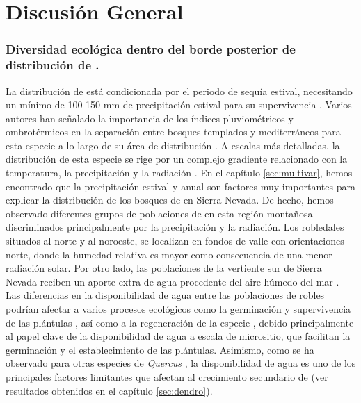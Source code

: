 %
\chapter{\textcolor{ctcolormain}{Discusión General}}\label{sec:discussions}
\newpage

\subsection*{Diversidad ecológica dentro del borde posterior de distribución de \Qp. }\label{sec:discussions:diversidad}

La distribución de \Qp está condicionada por el periodo de sequía estival, necesitando un mínimo de 100-150 mm de precipitación estival para su supervivencia \autocite{BlancoCastroetal2005BosquesIbericos,GarciaJimenez20099230Robledales}. Varios autores han señalado la importancia de los índices pluviométricos y ombrotérmicos en la separación entre bosques templados y mediterráneos para esta especie a lo largo de su área de distribución \autocite{delRioetal2007BioclimaticAnalysis}. A escalas más detalladas, la distribución de esta especie se rige por un complejo gradiente relacionado con la temperatura, la precipitación y la radiación \autocites{Gavilanetal2007ModellingCurrent,Urbietaetal2011MediterraneanPine}. En el capítulo \ref{sec:multivar}, hemos encontrado que la precipitación estival y anual son factores muy importantes para explicar la distribución de los bosques de \Qp en Sierra Nevada. De hecho, hemos observado diferentes grupos de poblaciones de \Qp en esta región montañosa discriminados principalmente por la precipitación y la radiación. Los robledales situados al norte y al noroeste, se localizan en fondos de valle con orientaciones norte, donde la humedad relativa es mayor como consecuencia de una menor radiación solar. Por otro lado, las poblaciones de la vertiente sur de Sierra Nevada reciben un aporte extra de agua procedente del aire húmedo del mar \autocite{MartinezParrasMoleroMesa1982EcologiaFitosociologia}. Las diferencias en la disponibilidad de agua entre las poblaciones de robles podrían afectar a varios procesos ecológicos como la germinación y supervivencia de las plántulas \autocites{Gomez2003ImpactVertebrate, GomezAparicioetal2008OakSeedling,Mendozaetal2009SeedingExperiment}, así como a la regeneración de la especie \autocites{Gomezetal2001ProblemasRegeneracion}, debido principalmente al papel clave de la disponibilidad de agua a escala de micrositio, que facilitan la germinación y el establecimiento de las plántulas. Asimismo, como se ha observado para otras especies de \emph{Quercus} \autocites[\emph{e.g.}][]{Tessieretal1994DeciduousQuercus,DiFilippoetal2010ClimateChange,GeaIzquierdoetal2011TreeringsReflect,GarciaGonzalezSoutoHerrero2017EarlywoodVessel}, la disponibilidad de agua es uno de los principales factores limitantes que afectan al crecimiento secundario de \Qp (ver resultados obtenidos en el capítulo \ref{sec:dendro}). 

